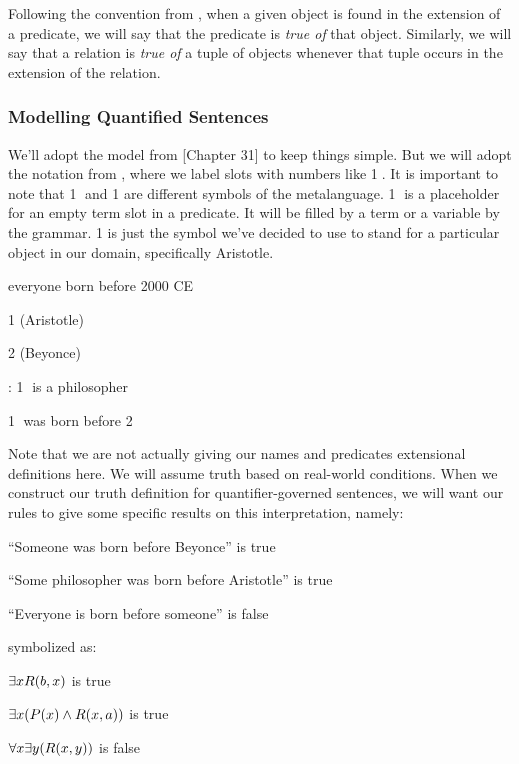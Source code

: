 Following the convention from \cite{Mag25}, when a given object is found in the
extension of a predicate, we will say that the predicate is \emph{true of} that
object. Similarly, we will say that a relation is \emph{true of} a tuple of
objects whenever that tuple occurs in the extension of the relation.

\subsubsection{Modelling Quantified Sentences}

We'll adopt the model from \cite{Mag25}[Chapter 31] to keep things simple. But
we will adopt the notation from \cite{Smi20}, where we label slots with numbers
like \textcircled{1}. It is important to note that \textcircled{1} and 1 are
different symbols of the metalanguage. \textcircled{1} is a placeholder for
an empty term slot in a predicate. It will be filled by a term or a variable
by the grammar. 1 is just the symbol we've decided to use to stand for a
particular object in our domain, specifically Aristotle.

\begin{argument}
\item[\textbf{D:}] everyone born before 2000 CE
\item[a:] 1 (Aristotle)
\item[b:] 2 (Beyonce)
\item[P]: \textcircled{1} is a philosopher
\item[R:] \textcircled{1} was born before \textcircled{2}
\end{argument}

Note that we are not actually giving our names and predicates extensional
definitions here. We will assume truth based on real-world conditions. When
we construct our truth definition for quantifier-governed sentences, we will
want our rules to give some specific results on this interpretation, namely:

\begin{argument}
\item[ ] ``Someone was born before Beyonce'' is true
\item[ ] ``Some philosopher was born before Aristotle'' is true
\item[ ] ``Everyone is born before someone'' is false
\end{argument}

symbolized as:

\begin{argument}
\item[ ] $\exists xR(b,x)$ is true
\item[ ] $\exists x(P(x)\wedge R(x,a))$ is true
\item[ ] $\forall x\exists y(R(x,y))$ is false
\end{argument}

